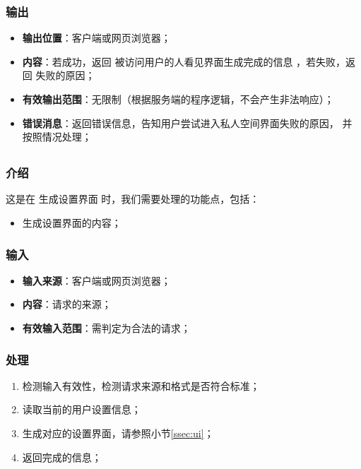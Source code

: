 {\subsubsection{输出}
\begin{itemize}
	\item \textbf{输出位置}：客户端或网页浏览器；
	\item \textbf{内容}：若成功，返回 被访问用户的人看见界面生成完成的信息 ，若失败，返回 失败的原因；
	\item \textbf{有效输出范围}：无限制（根据服务端的程序逻辑，不会产生非法响应）；
	\item \textbf{错误消息}：返回错误信息，告知用户尝试进入私人空间界面失败的原因，
		并按照情况处理；
\end{itemize}
}
 
\subsection{}
\subsubsection{介绍}
	这是在 生成设置界面 时，我们需要处理的功能点，包括：
	\begin{itemize}
		\item 生成设置界面的内容；
	\end{itemize}
\subsubsection{输入}
	\begin{itemize}
		\item \textbf{输入来源}：客户端或网页浏览器；
		\item \textbf{内容}：请求的来源；
		\item \textbf{有效输入范围}：需判定为合法的请求；
	\end{itemize}
\subsubsection{处理}
	\begin{enumerate}
		\item 检测输入有效性，检测请求来源和格式是否符合标准；
		\item 读取当前的用户设置信息；
		\item 生成对应的设置界面，请参照小节\ref{ssec:ui}；
		\item 返回完成的信息；
	\end{enumerate}

